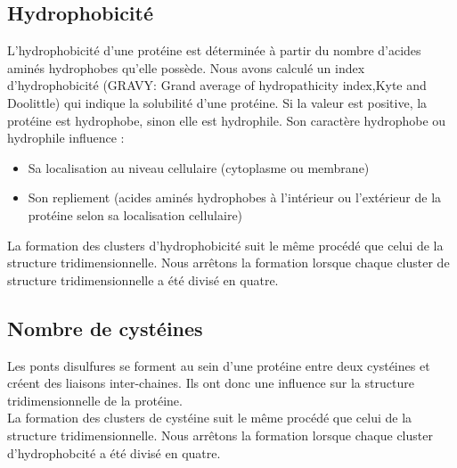 \subsection*{Hydrophobicité}
L'hydrophobicité d'une protéine est déterminée à partir du nombre d'acides aminés hydrophobes qu'elle possède.
Nous avons calculé un index d'hydrophobicité (GRAVY: Grand average of hydropathicity index,Kyte and Doolittle) qui indique la solubilité d'une protéine. Si la valeur est positive, la protéine est hydrophobe, sinon elle est hydrophile.
Son caractère hydrophobe ou hydrophile influence :
\begin{itemize}
\item Sa localisation au niveau cellulaire (cytoplasme ou membrane)
\item Son repliement (acides aminés hydrophobes à l'intérieur ou l'extérieur de la protéine selon sa localisation cellulaire) 
\end{itemize}
La formation des clusters d'hydrophobicité suit le m\^eme procédé que celui de la structure tridimensionnelle. Nous arr\^etons la formation lorsque chaque cluster de structure tridimensionnelle a été divisé en quatre.

\subsection*{Nombre de cystéines}
Les ponts disulfures se forment au sein d'une protéine entre deux cystéines et créent des liaisons inter-chaines. Ils ont donc une influence sur la structure tridimensionnelle de la protéine.\\
La formation des clusters de cystéine suit le m\^eme procédé que celui de la structure tridimensionnelle. Nous arr\^etons la formation lorsque chaque cluster d'hydrophobcité a été divisé en quatre.

